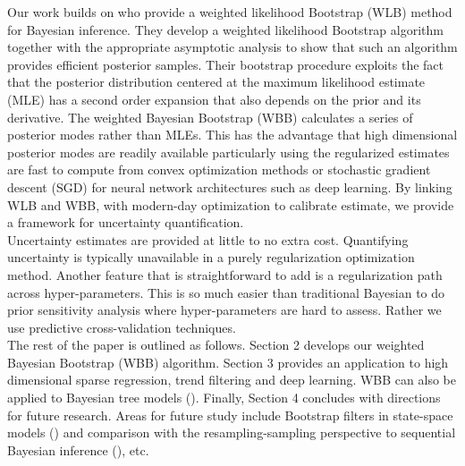 \documentclass[12pt]{TD-CJS}
\begin{document}
\noindent Our work builds on \cite{newton1994approximate} who provide a weighted likelihood Bootstrap (WLB) method for Bayesian inference. They develop a weighted likelihood Bootstrap algorithm together with the appropriate asymptotic analysis to show that such an algorithm 
provides efficient posterior samples. Their bootstrap procedure exploits the fact that the posterior distribution centered at the maximum likelihood estimate (MLE) has a second order expansion that also depends on the prior
and its derivative. The weighted Bayesian Bootstrap (WBB) calculates a series of posterior modes rather than MLEs. This has the advantage that high dimensional posterior modes are readily available particularly using the regularized estimates are fast to compute from convex optimization methods or stochastic gradient descent (SGD) for neural network architectures such as deep learning. By linking WLB and WBB, with modern-day optimization to calibrate estimate, we provide a framework for uncertainty quantification.\\

\noindent Uncertainty estimates are provided at little to no extra cost. Quantifying uncertainty is typically unavailable in a purely regularization optimization method. Another feature that is straightforward to add is a regularization path across hyper-parameters. This is so much easier than traditional Bayesian to do prior sensitivity analysis where hyper-parameters are hard to assess. Rather we use predictive cross-validation techniques.\\

\noindent The rest of the paper is outlined as follows. Section 2 develops our weighted Bayesian Bootstrap (WBB) algorithm. Section 3 provides an application to high dimensional sparse regression, trend filtering and deep learning. WBB can also be applied to Bayesian tree models (\cite{taddy2015bayesian}). Finally, Section 4 concludes with directions for future research. Areas for future study include Bootstrap filters in state-space models (\cite{gordon1993novel})  and comparison with the resampling-sampling
perspective to sequential Bayesian inference (\cite{lopes2012bayesian}), etc.
\end{document}

